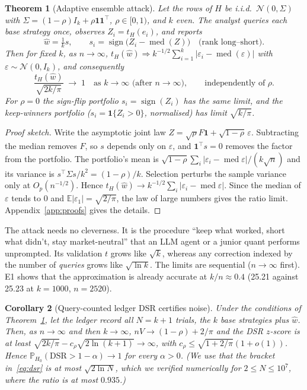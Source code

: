 \documentclass[11pt]{article}
\newtheorem{theorem}{Theorem}
\newtheorem{corollary}[theorem]{Corollary}
\theoremstyle{definition}
\theoremstyle{remark}
\newcommand{\E}{\mathbb{E}}
\newcommand{\Prob}{\mathbb{P}}
\newcommand{\tH}{t_{H}}
\begin{document}
\begin{theorem}[Adaptive ensemble attack]\label{thm:attack}
Let the rows of $H$ be i.i.d.\ $\mathcal N(0,\Sigma)$ with $\Sigma=(1-\rho)I_k+\rho\mathbf 1\mathbf 1^\top$, $\rho\in[0,1)$, and $k$ even. The analyst queries each base strategy once, observes $Z_i=\tH(e_i)$, and reports
\[\hat w=\tfrac1k s,\qquad s_i=\operatorname{sign}\big(Z_i-\operatorname{med}(Z)\big)\quad\text{(rank long--short)}.\]
Then for fixed $k$, as $n\to\infty$, $\tH(\hat w)\Rightarrow k^{-1/2}\sum_{i=1}^k|\varepsilon_i-\operatorname{med}(\varepsilon)|$ with $\varepsilon\sim\mathcal N(0,I_k)$, and consequently
\[\frac{\tH(\hat w)}{\sqrt{2k/\pi}}\;\longrightarrow\;1\quad\text{as }k\to\infty\text{ (after }n\to\infty),\qquad\text{independently of }\rho.\]
For $\rho=0$ the sign-flip portfolio $s_i=\operatorname{sign}(Z_i)$ has the same limit, and the keep-winners portfolio ($s_i=\mathbf{1}\{Z_i>0\}$, normalised) has limit $\sqrt{k/\pi}$.
\end{theorem}
\begin{proof}[Proof sketch]
Write the asymptotic joint law $Z=\sqrt\rho F\mathbf 1+\sqrt{1-\rho}\,\varepsilon$. Subtracting the median removes $F$, so $s$ depends only on $\varepsilon$, and $\mathbf 1^\top s=0$ removes the factor from the portfolio. The portfolio's mean is $\sqrt{1-\rho}\sum_i|\varepsilon_i-\operatorname{med}\varepsilon|/(k\sqrt n)$ and its variance is $s^\top\Sigma s/k^2=(1-\rho)/k$. Selection perturbs the sample variance only at $O_p(n^{-1/2})$. Hence $\tH(\hat w)\to k^{-1/2}\sum_i|\varepsilon_i-\operatorname{med}\varepsilon|$. Since the median of $\varepsilon$ tends to $0$ and $\E|\varepsilon_1|=\sqrt{2/\pi}$, the law of large numbers gives the ratio limit. Appendix~\ref{app:proofs} gives the details.
\end{proof}

The attack needs no cleverness. It is the procedure ``keep what worked, short what didn't, stay market-neutral'' that an LLM agent or a junior quant performs unprompted. Its validation $t$ grows like $\sqrt k$, whereas any correction indexed by the number of \emph{queries} grows like $\sqrt{\ln k}$. The limits are sequential ($n\to\infty$ first). E1 shows that the approximation is already accurate at $k/n\approx0.4$ (25.21 against 25.23 at $k=1000$, $n=2520$).

\begin{corollary}[Query-counted ledger DSR certifies noise]\label{cor:dsr}
Under the conditions of Theorem~\ref{thm:attack}, let the ledger record all $N=k+1$ trials, the $k$ base strategies plus $\hat w$. Then, as $n\to\infty$ and then $k\to\infty$, $nV\to(1-\rho)+2/\pi$ and the DSR $z$-score is at least $\sqrt{2k/\pi}-c_\rho\sqrt{2\ln(k+1)}\to\infty$, with $c_\rho\le\sqrt{1+2/\pi}(1+o(1))$. Hence $\Prob_{H_0}(\mathrm{DSR}>1-\alpha)\to1$ for every $\alpha>0$. (We use that the bracket in~\eqref{eq:dsr} is at most $\sqrt{2\ln N}$, which we verified numerically for $2\le N\le10^7$, where the ratio is at most $0.935$.)
\end{corollary}
\end{document}
